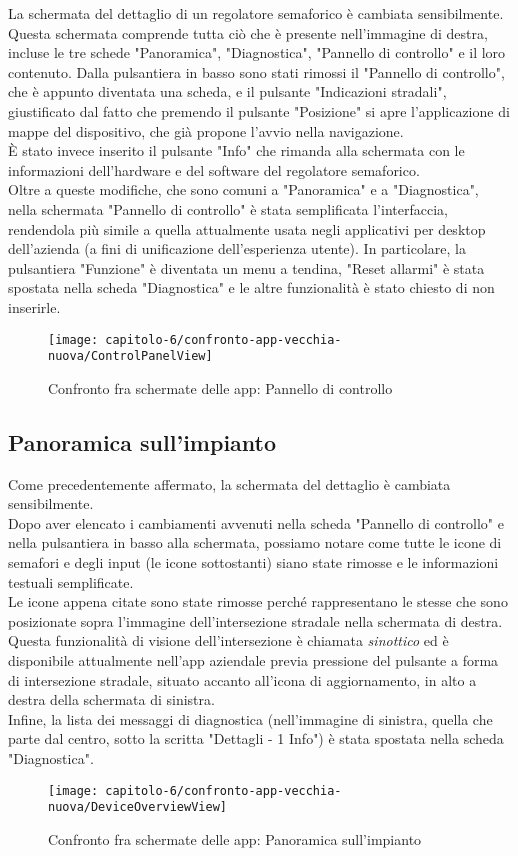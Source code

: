 La schermata del dettaglio di un regolatore semaforico è cambiata sensibilmente.\\
Questa schermata comprende tutta ciò che è presente nell'immagine di destra, incluse le tre schede "Panoramica", "Diagnostica", "Pannello di controllo" e il loro contenuto.
Dalla pulsantiera in basso sono stati rimossi il "Pannello di controllo", che è appunto diventata una scheda, e il pulsante "Indicazioni stradali", giustificato dal fatto che premendo il pulsante "Posizione" si apre l'applicazione di mappe del dispositivo, che già propone l'avvio nella navigazione.\\
È stato invece inserito il pulsante "Info" che rimanda alla schermata con le informazioni dell'hardware e del software del regolatore semaforico.\\
Oltre a queste modifiche, che sono comuni a "Panoramica" e a "Diagnostica", nella schermata "Pannello di controllo" è stata semplificata l'interfaccia, rendendola più simile a quella attualmente usata negli applicativi per desktop dell'azienda (a fini di unificazione dell'esperienza utente).
In particolare, la pulsantiera "Funzione" è diventata un menu a tendina, "Reset allarmi" è stata spostata nella scheda "Diagnostica" e le altre funzionalità è stato chiesto di non inserirle.

\begin{figure}[!h]
  \centering 
  \texttt{[image: capitolo-6/confronto-app-vecchia-nuova/ControlPanelView]} 
  \caption{Confronto fra schermate delle app: Pannello di controllo}
\end{figure}

\clearpage %

\subsection{Panoramica sull'impianto}
\label{subsec:panoramica-impianto}

Come precedentemente affermato, la schermata del dettaglio è cambiata sensibilmente.\\
Dopo aver elencato i cambiamenti avvenuti nella scheda "Pannello di controllo" e nella pulsantiera in basso alla schermata, possiamo notare come tutte le icone di semafori e degli input (le icone sottostanti) siano state rimosse e le informazioni testuali semplificate.\\
Le icone appena citate sono state rimosse perché rappresentano le stesse che sono posizionate sopra l'immagine dell'intersezione stradale nella schermata di destra.
Questa funzionalità di visione dell'intersezione è chiamata \emph{sinottico} ed è disponibile attualmente nell'app aziendale previa pressione del pulsante a forma di intersezione stradale, situato accanto all'icona di aggiornamento, in alto a destra della schermata di sinistra.\\
Infine, la lista dei messaggi di diagnostica (nell'immagine di sinistra, quella che parte dal centro, sotto la scritta "Dettagli - 1 Info") è stata spostata nella scheda "Diagnostica".

\begin{figure}[!h]
  \centering 
  \texttt{[image: capitolo-6/confronto-app-vecchia-nuova/DeviceOverviewView]} 
  \caption{Confronto fra schermate delle app: Panoramica sull'impianto}
\end{figure}